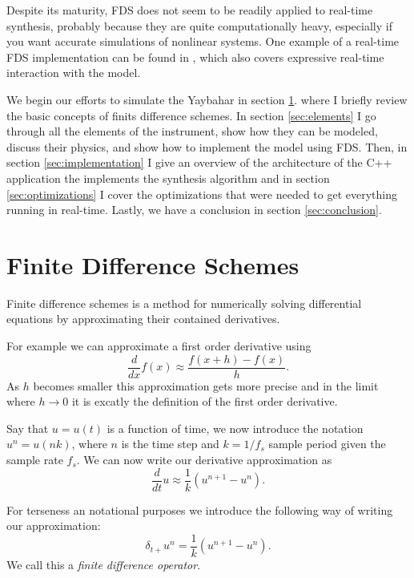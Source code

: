 \documentclass{article}
\begin{document}
Despite its maturity, FDS does not seem to be readily applied to real-time synthesis, probably because they are quite computationally heavy, especially if you want accurate simulations of nonlinear systems.
One example of a real-time FDS implementation can be found in \cite{willemsen_real-time_2019}, which also covers expressive real-time interaction with the model.

We begin our efforts to simulate the Yaybahar in section \ref{sec:finiteDifferenceSchemes}. where I briefly review the basic concepts of finits difference schemes.
In section \ref{sec:elements} I go through all the elements of the instrument, show how they can be modeled, discuss their physics, and show how to implement the model using FDS.
Then, in section \ref{sec:implementation} I give an overview of the architecture of the C++ application the implements the synthesis algorithm and in section \ref{sec:optimizations} I cover the optimizations that were needed to get everything running in real-time.
Lastly, we have a conclusion in section \ref{sec:conclusion}.

\section{Finite Difference Schemes}
\label{sec:finiteDifferenceSchemes}

Finite difference schemes is a method for numerically solving differential equations by approximating their contained derivatives.

For example we can approximate a first order derivative using
\begin{equation}
  \frac{d}{dx} f(x) \approx \frac{f(x + h) - f(x)}{h}.
\end{equation}
As $h$ becomes smaller this approximation gets more precise and in the limit where $h\rightarrow 0$ it is excatly the definition of the first order derivative.

Say that $u = u(t)$ is a function of time, we now introduce the notation $u^n = u(nk)$, where $n$ is the time step and $k = 1/f_s$ sample period given the sample rate $f_s$.
We can now write our derivative approximation as
\begin{equation}
  \frac{d}{dt} u \approx \frac{1}{k} (u^{n+1} - u^{n}).
\end{equation}

For terseness an notational purposes we introduce the following way of writing our approximation:
\begin{equation}
  \label{eq:dtf}
  \delta_{t+} u^n = \frac{1}{k} (u^{n+1} - u^{n}).
\end{equation}
We call this a \textit{finite difference operator}.
\end{document}
